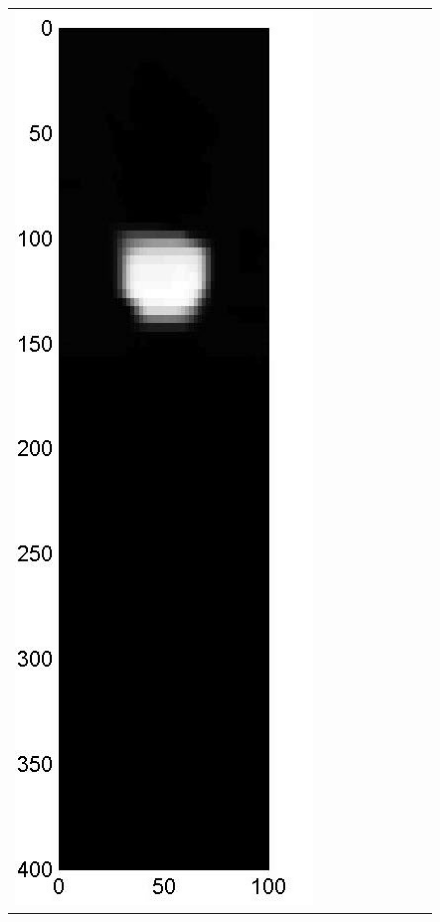 \documentclass[english]{siamltex}
\begin{document}
{\begin{figure}[!h]
\begin{center}
\begin{tabular}{|c|c|c|c|c|c|c|c|c|}
			\includegraphics[width=.9\iwidth]{figures/newFigs/noisy/resultsExp-2-mkTV}
			&

\end{tabular}
\end{center}
\end{figure}}
\end{document}
